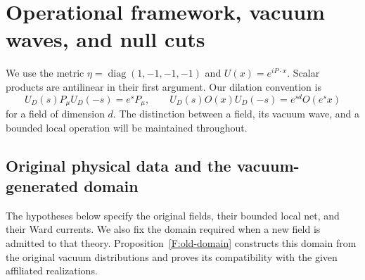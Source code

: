 \section{Operational framework, vacuum waves, and null cuts}
\label{sec:foundations}

We use the metric $\eta=\operatorname{diag}(1,-1,-1,-1)$ and
$U(x)=e^{iP\cdot x}$. Scalar products are antilinear in their first
argument. Our dilation convention is
\[
 U_D(s)P_\mu U_D(-s)=e^sP_\mu,\qquad
 U_D(s)O(x)U_D(-s)=e^{sd}O(e^sx)
\]
for a field of dimension $d$. The distinction between a field, its
vacuum wave, and a bounded local operation will be maintained throughout.

\subsection{Original physical data and the vacuum-generated domain}

The hypotheses below specify the original fields, their bounded local
net, and their Ward currents. We also fix the domain required when a
new field is admitted to that theory. Proposition~\ref{F:old-domain}
constructs this domain from the original vacuum distributions and
proves its compatibility with the given affiliated realizations.

